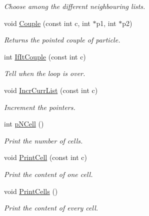 \begin{DoxyCompactItemize}
\begin{DoxyCompactList}\small\item\em Choose among the different neighbouring lists. \end{DoxyCompactList}\item 
void \hyperlink{classDdArray_aabccb7f79ac6e104734750f00fa72b76}{Couple} (const int c, int $\ast$p1, int $\ast$p2)\hypertarget{classDdArray_aabccb7f79ac6e104734750f00fa72b76}{}\label{classDdArray_aabccb7f79ac6e104734750f00fa72b76}

\begin{DoxyCompactList}\small\item\em Returns the pointed couple of particle. \end{DoxyCompactList}\item 
int \hyperlink{classDdArray_a3896db13faf370f18b2a70c6acd01930}{If\+It\+Couple} (const int c)\hypertarget{classDdArray_a3896db13faf370f18b2a70c6acd01930}{}\label{classDdArray_a3896db13faf370f18b2a70c6acd01930}

\begin{DoxyCompactList}\small\item\em Tell when the loop is over. \end{DoxyCompactList}\item 
void \hyperlink{classDdArray_a0c040f6773c460a8eb46bff752c08d2d}{Incr\+Curr\+List} (const int c)\hypertarget{classDdArray_a0c040f6773c460a8eb46bff752c08d2d}{}\label{classDdArray_a0c040f6773c460a8eb46bff752c08d2d}

\begin{DoxyCompactList}\small\item\em Increment the pointers. \end{DoxyCompactList}\item 
int \hyperlink{classDdArray_a02631cacc3cd393a64b7e78df3734e48}{p\+N\+Cell} ()\hypertarget{classDdArray_a02631cacc3cd393a64b7e78df3734e48}{}\label{classDdArray_a02631cacc3cd393a64b7e78df3734e48}

\begin{DoxyCompactList}\small\item\em Print the number of cells. \end{DoxyCompactList}\item 
void \hyperlink{classDdArray_af5188eb0e6caae79f8bf349bf2345cf2}{Print\+Cell} (const int c)\hypertarget{classDdArray_af5188eb0e6caae79f8bf349bf2345cf2}{}\label{classDdArray_af5188eb0e6caae79f8bf349bf2345cf2}

\begin{DoxyCompactList}\small\item\em Print the content of one cell. \end{DoxyCompactList}\item 
void \hyperlink{classDdArray_a1132024d8fdd721fd6a36781d4235162}{Print\+Cells} ()\hypertarget{classDdArray_a1132024d8fdd721fd6a36781d4235162}{}\label{classDdArray_a1132024d8fdd721fd6a36781d4235162}

\begin{DoxyCompactList}\small\item\em Print the content of every cell. \end{DoxyCompactList}\end{DoxyCompactItemize}
